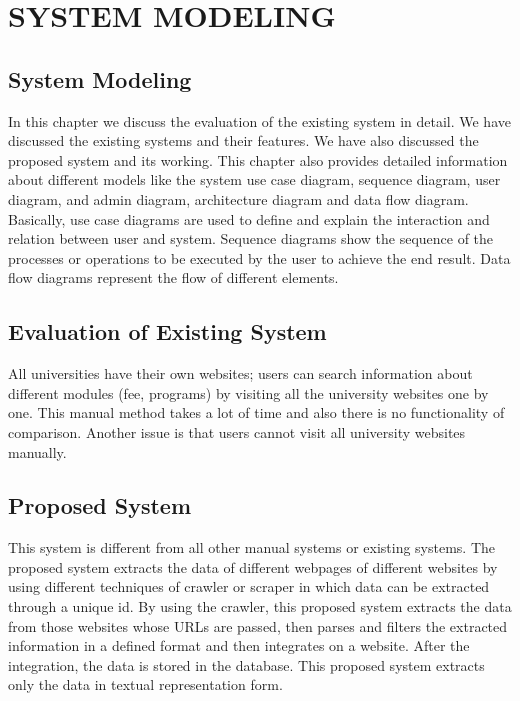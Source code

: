 \chapter{SYSTEM MODELING}

\section{System Modeling}

In this chapter we discuss the evaluation of the existing system in detail. We have discussed the existing systems and their features. We have also discussed the proposed system and its working. This chapter also provides detailed information about different models like the system use case diagram, sequence diagram, user diagram, and admin diagram, architecture diagram and data flow diagram. Basically, use case diagrams are used to define and explain the interaction and relation between user and system. Sequence diagrams show the sequence of the processes or operations to be executed by the user to achieve the end result. Data flow diagrams represent the flow of different elements.

\section{Evaluation of Existing System}

All universities have their own websites; users can search information about different modules (fee, programs) by visiting all the university websites one by one. This manual method takes a lot of time and also there is no functionality of comparison. Another issue is that users cannot visit all university websites manually.

\section{Proposed System}

This system is different from all other manual systems or existing systems. The proposed system extracts the data of different webpages of different websites by using different techniques of crawler or scraper in which data can be extracted through a unique id. By using the crawler, this proposed system extracts the data from those websites whose URLs are passed, then parses and filters the extracted information in a defined format and then integrates on a website. After the integration, the data is stored in the database. This proposed system extracts only the data in textual representation form.

